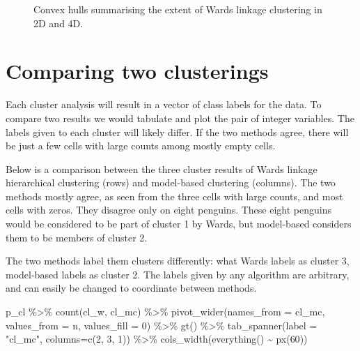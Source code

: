 \documentclass[
  letterpaper,
]{krantz}
\newenvironment{Shaded}{\begin{snugshade}}{\end{snugshade}}
\newcommand{\AttributeTok}[1]{\textcolor[rgb]{0.40,0.45,0.13}{#1}}
\newcommand{\DecValTok}[1]{\textcolor[rgb]{0.68,0.00,0.00}{#1}}
\newcommand{\FunctionTok}[1]{\textcolor[rgb]{0.28,0.35,0.67}{#1}}
\newcommand{\NormalTok}[1]{\textcolor[rgb]{0.00,0.23,0.31}{#1}}
\newcommand{\SpecialCharTok}[1]{\textcolor[rgb]{0.37,0.37,0.37}{#1}}
\newcommand{\StringTok}[1]{\textcolor[rgb]{0.13,0.47,0.30}{#1}}
\begin{document}
\begin{figure}
\begin{minipage}{0.50\linewidth}
{}


\end{minipage}%

\caption{\label{fig-penguins-chull-pdf}Convex hulls summarising the
extent of Wards linkage clustering in 2D and 4D.}

\end{figure}%

\section{Comparing two clusterings}\label{comparing-two-clusterings}

Each cluster analysis will result in a vector of class labels for the
data. To compare two results we would tabulate and plot the pair of
integer variables. The labels given to each cluster will likely differ.
If the two methods agree, there will be just a few cells with large
counts among mostly empty cells.

Below is a comparison between the three cluster results of Wards linkage
hierarchical clustering (rows) and model-based clustering (columns). The
two methods mostly agree, as seen from the three cells with large
counts, and most cells with zeros. They disagree only on eight penguins.
These eight penguins would be considered to be part of cluster 1 by
Wards, but model-based considers them to be members of cluster 2.

The two methods label them clusters differently: what Wards labels as
cluster 3, model-based labels as cluster 2. The labels given by any
algorithm are arbitrary, and can easily be changed to coordinate between
methods.

\begin{Shaded}
\begin{Highlighting}[]
\NormalTok{p\_cl }\SpecialCharTok{\%\textgreater{}\%} 
  \FunctionTok{count}\NormalTok{(cl\_w, cl\_mc) }\SpecialCharTok{\%\textgreater{}\%} 
  \FunctionTok{pivot\_wider}\NormalTok{(}\AttributeTok{names\_from =}\NormalTok{ cl\_mc, }
              \AttributeTok{values\_from =}\NormalTok{ n, }
              \AttributeTok{values\_fill =} \DecValTok{0}\NormalTok{) }\SpecialCharTok{\%\textgreater{}\%}
  \FunctionTok{gt}\NormalTok{() }\SpecialCharTok{\%\textgreater{}\%}
  \FunctionTok{tab\_spanner}\NormalTok{(}\AttributeTok{label =} \StringTok{"cl\_mc"}\NormalTok{, }\AttributeTok{columns=}\FunctionTok{c}\NormalTok{(}\StringTok{\textasciigrave{}}\AttributeTok{2}\StringTok{\textasciigrave{}}\NormalTok{, }\StringTok{\textasciigrave{}}\AttributeTok{3}\StringTok{\textasciigrave{}}\NormalTok{, }\StringTok{\textasciigrave{}}\AttributeTok{1}\StringTok{\textasciigrave{}}\NormalTok{)) }\SpecialCharTok{\%\textgreater{}\%}
  \FunctionTok{cols\_width}\NormalTok{(}\FunctionTok{everything}\NormalTok{() }\SpecialCharTok{\textasciitilde{}} \FunctionTok{px}\NormalTok{(}\DecValTok{60}\NormalTok{))}
\end{Highlighting}
\end{Shaded}
\end{document}

